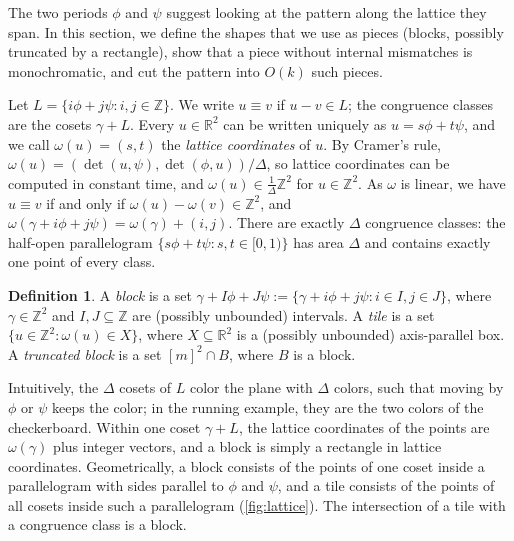 \documentclass[11pt]{article}
\theoremstyle{definition}
\newtheorem{definition}[theorem]{Definition}
\newcommand{\Z}{\mathbb{Z}}
\newcommand{\R}{\mathbb{R}}
\renewcommand{\O}{O}
\begin{document}
The two periods $\phi$ and $\psi$ suggest looking at the pattern along the lattice they span.
In this section, we define the shapes that we use as pieces (blocks, possibly truncated by a rectangle), show that a piece without internal mismatches is monochromatic, and cut the pattern into $\O(k)$ such pieces.

Let $L = \{i\phi + j\psi : i, j \in \Z\}$. We write $u \equiv v$ if $u - v \in L$; the congruence classes are the cosets $\gamma + L$.
Every $u \in \R^2$ can be written uniquely as $u = s\phi + t\psi$, and we call $\omega(u) = (s,t)$ the \emph{lattice coordinates} of $u$.
By Cramer's rule, $\omega(u) = (\det(u,\psi), \det(\phi,u))/\Delta$, so lattice coordinates can be computed in constant time, and $\omega(u) \in \frac{1}{\Delta}\Z^2$ for $u \in \Z^2$.
As $\omega$ is linear, we have $u \equiv v$ if and only if $\omega(u) - \omega(v) \in \Z^2$, and $\omega(\gamma + i\phi + j\psi) = \omega(\gamma) + (i,j)$.
There are exactly $\Delta$ congruence classes: the half-open parallelogram $\{s\phi + t\psi : s, t \in [0,1)\}$ has area $\Delta$ and contains exactly one point of every class.

\begin{definition}
A \emph{block} is a set $\gamma + I\phi + J\psi := \{\gamma + i\phi + j\psi : i \in I, j \in J\}$, where $\gamma \in \Z^2$ and $I, J \subseteq \Z$ are (possibly unbounded) intervals.
A \emph{tile} is a set $\{u \in \Z^2 : \omega(u) \in X\}$, where $X \subseteq \R^2$ is a (possibly unbounded) axis-parallel box.
A \emph{truncated block} is a set $[m]^2 \cap B$, where $B$ is a block.
\end{definition}

Intuitively, the $\Delta$ cosets of $L$ color the plane with $\Delta$ colors, such that moving by $\phi$ or $\psi$ keeps the color; in the running example, they are the two colors of the checkerboard.
Within one coset $\gamma + L$, the lattice coordinates of the points are $\omega(\gamma)$ plus integer vectors, and a block is simply a rectangle in lattice coordinates.
Geometrically, a block consists of the points of one coset inside a parallelogram with sides parallel to $\phi$ and $\psi$, and a tile consists of the points of all cosets inside such a parallelogram (\autoref{fig:lattice}).
The intersection of a tile with a congruence class is a block.
\end{document}
